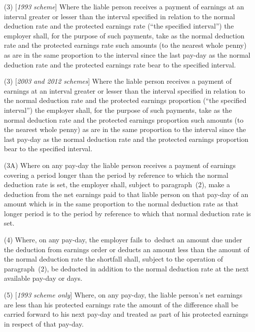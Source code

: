 \documentclass[12pt,a4paper]{article}
\begin{document}
(3) [\emph{1993 scheme}] Where the liable person receives a payment of earnings at an interval greater or lesser than the interval specified in relation to the normal deduction rate and the protected earnings rate (“the specified interval”) the employer shall, for the purpose of such payments, take as the normal deduction rate and the protected earnings rate such amounts (to the nearest whole penny) as are in the same proportion to the interval since the last pay-day as the normal deduction rate and the protected earnings rate bear to the specified interval.

(3) [\emph{2003 and 2012 schemes}] Where the liable person receives a payment of earnings at an interval greater or lesser than the interval specified in relation to the normal deduction rate and the 
protected earnings proportion  %
(“the specified interval”) the employer shall, for the purpose of such payments, take as the normal deduction rate and the  
protected earnings proportion  %
such amounts (to the nearest whole penny) as are in the same proportion to the interval since the last pay-day as the normal deduction rate and the  
protected earnings proportion  %
bear to the specified interval.

(3A) Where on any pay-day the liable person receives a payment of earnings covering a period longer than the period by reference to which the normal deduction rate is set, the employer shall, subject to paragraph~(2), make a deduction from the net earnings paid to that liable person on that pay-day of an amount which is in the same proportion to the normal deduction rate as that longer period is to the period by reference to which that normal deduction rate is set.

(4) Where, on any pay-day, the employer fails to~deduct an amount due under the deduction from earnings order or deducts an amount less than the amount of the normal deduction rate the shortfall shall, subject to the operation of paragraph~(2), be deducted in addition to the normal deduction rate at the next available pay-day or days.

(5) [\emph{1993 scheme only}] Where, on any pay-day, the liable person’s net earnings are less than his protected earnings rate the amount of the difference shall be carried forward to his next pay-day and treated as part of his protected earnings in respect of that pay-day.
\end{document}

